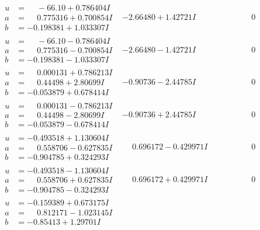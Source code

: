 \documentclass[1p]{elsarticle_modified}
\theoremstyle{definition}
\begin{document}
$$\begin{array}{c|c|c}
\begin{aligned}
u &= \phantom{-}     -6
6. 10   + 0.786404 I \\
a &= \phantom{-}0.775316 + 0.700854 I \\
b &= -0.198381 + 1.033307 I\end{aligned}
 & -2.66480 + 1.42721 I & \phantom{-0.000000 } 0 \\ \hline\begin{aligned}
u &= \phantom{-}     -6
6. 10   - 0.786404 I \\
a &= \phantom{-}0.775316 - 0.700854 I \\
b &= -0.198381 - 1.033307 I\end{aligned}
 & -2.66480 - 1.42721 I & \phantom{-0.000000 } 0 \\ \hline\begin{aligned}
u &= \phantom{-}0.000131 + 0.786213 I \\
a &= \phantom{-}0.44498 + 2.80699 I \\
b &= -0.053879 + 0.678414 I\end{aligned}
 & -0.90736 - 2.44785 I & \phantom{-0.000000 } 0 \\ \hline\begin{aligned}
u &= \phantom{-}0.000131 - 0.786213 I \\
a &= \phantom{-}0.44498 - 2.80699 I \\
b &= -0.053879 - 0.678414 I\end{aligned}
 & -0.90736 + 2.44785 I & \phantom{-0.000000 } 0 \\ \hline\begin{aligned}
u &= -0.493518 + 1.130604 I \\
a &= \phantom{-}0.558706 - 0.627835 I \\
b &= -0.904785 + 0.324293 I\end{aligned}
 & \phantom{-}0.696172 - 0.429971 I & \phantom{-0.000000 } 0 \\ \hline\begin{aligned}
u &= -0.493518 - 1.130604 I \\
a &= \phantom{-}0.558706 + 0.627835 I \\
b &= -0.904785 - 0.324293 I\end{aligned}
 & \phantom{-}0.696172 + 0.429971 I & \phantom{-0.000000 } 0 \\ \hline\begin{aligned}
u &= -0.159389 + 0.673175 I \\
a &= \phantom{-}0.812171 - 1.023145 I \\
b &= -0.85413 + 1.29701 I\end{aligned}

\end{array}$$
\end{document}
